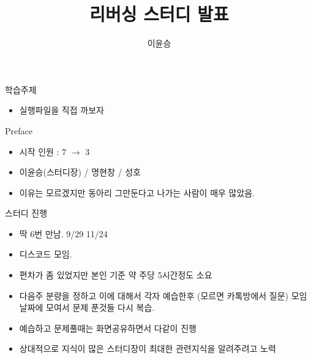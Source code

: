 \documentclass[10pt]{beamer}
\title{리버싱 스터디 발표}
\author{이윤승}
\begin{document}
\begin{frame}
  \maketitle
\end{frame}


\begin{frame}{학습주제}
    \begin{itemize}
        \item 실행파일을 직접 까보자
    \end{itemize}

\end{frame}

\begin{frame}{Preface}
    \begin{itemize}
        \item 시작 인원 : 7 $\rightarrow$ 3
        \item 이윤승(스터디장) / 명현창 / 성호
        \item 이유는 모르겠지만 동아리 그만둔다고 나가는 사람이 매우 많았음.
    \end{itemize}
\end{frame}

\begin{frame}{스터디 진행}
    \begin{itemize}
        \item 딱 6번 만남. 9/29  11/24
        \item 디스코드 모임.
        \item 편차가 좀 있었지만 본인 기준 약 주당 5시간정도 소요
        \item 다음주 분량을 정하고 이에 대해서 각자 예습한후 (모르면 카톡방에서 질문) 모임날짜에 모여서 문제 푼것들 다시 복습.
        \item 예습하고 문제풀때는 화면공유하면서 다같이 진행
        \item 상대적으로 지식이 많은 스터디장이 최대한 관련지식을 알려주려고 노력
    \end{itemize}
\end{frame}
\end{document}
